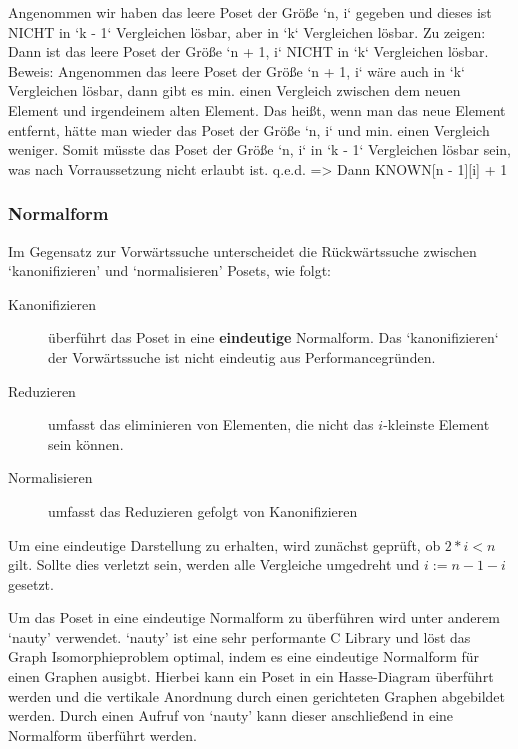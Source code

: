\documentclass[10pt,journal,compsoc]{IEEEtran}
\begin{document}

Angenommen wir haben das leere Poset der Größe `n, i` gegeben und dieses ist NICHT in `k - 1` Vergleichen lösbar, aber in `k` Vergleichen lösbar.
Zu zeigen: Dann ist das leere Poset der Größe `n + 1, i` NICHT in `k` Vergleichen lösbar.
Beweis: Angenommen das leere Poset der Größe `n + 1, i` wäre auch in `k` Vergleichen lösbar, dann gibt es min. einen Vergleich zwischen dem neuen Element und irgendeinem alten Element. Das heißt, wenn man das neue Element entfernt, hätte man wieder das Poset der Größe `n, i` und min. einen Vergleich weniger. Somit müsste das Poset der Größe `n, i` in `k - 1` Vergleichen lösbar sein, was nach Vorraussetzung nicht erlaubt ist. q.e.d.
=> Dann KNOWN[n - 1][i] + 1


\subsubsection{Normalform}
Im Gegensatz zur Vorwärtssuche unterscheidet die Rückwärtssuche zwischen `kanonifizieren' und `normalisieren' Posets, wie folgt:
\begin{description}
  \item[Kanonifizieren]
    überführt das Poset in eine \textbf{eindeutige} Normalform.
    Das `kanonifizieren` der Vorwärtssuche ist nicht eindeutig aus Performancegründen.
  \item[Reduzieren]
    umfasst das eliminieren von Elementen, die nicht das $i$-kleinste Element sein können.
  \item[Normalisieren]
    umfasst das Reduzieren gefolgt von Kanonifizieren
\end{description}

Um eine eindeutige Darstellung zu erhalten, wird zunächst geprüft, ob $2 * i < n$ gilt.
Sollte dies verletzt sein, werden alle Vergleiche umgedreht und $i := n - 1 - i$ gesetzt.

Um das Poset in eine eindeutige Normalform zu überführen wird unter anderem `nauty' verwendet.
`nauty' ist eine sehr performante C Library und löst das Graph Isomorphieproblem optimal, indem es eine eindeutige Normalform für einen Graphen ausigbt. %
Hierbei kann ein Poset in ein Hasse-Diagram überführt werden und die vertikale Anordnung durch einen gerichteten Graphen abgebildet werden.
Durch einen Aufruf von `nauty' kann dieser anschließend in eine Normalform überführt werden.
\end{document}
